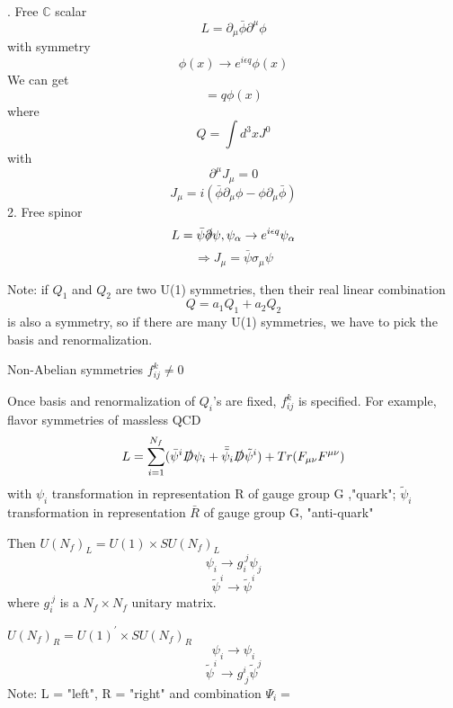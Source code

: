\documentclass[type = bachelor]{fduthesis-en}
\begin{document}
. Free $\mathbb{C}$ scalar 
\begin{equation}
L=\partial_{\mu}\bar{\phi}\partial^\mu\phi
\end{equation}
with symmetry 
\begin{equation}
\phi(x)\rightarrow e^{i\epsilon q}\phi(x)
\end{equation}
We can get
\begin{equation}
[Q,\phi(x)]=q\phi(x)
\end{equation}
where
\begin{equation}
Q=\int d^3x J^0 
\end{equation}
with 
\begin{equation}
\partial^\mu J_\mu = 0
\end{equation}
\begin{equation}
J_\mu=i(\bar{\phi}\partial_\mu\phi-\phi\partial_\mu\bar{\phi})
\end{equation}
2. Free spinor
\begin{equation}
L=\bar{\psi}\slashed{\partial}\psi, \psi_\alpha \rightarrow e^{i\epsilon q}\psi_\alpha
\end{equation}
$$\Rightarrow J_\mu = \bar{\psi}\sigma_\mu\psi$$

Note: if $Q_1$ and $Q_2$ are two U(1) symmetries, then their real linear combination 
\begin{equation}
Q=a_1Q_1+a_2Q_2
\end{equation}
is also a symmetry, so if there are many U(1) symmetries, we have to pick the basis and renormalization.

\bigskip
Non-Abelian symmetries $f^k_{ij}\neq0$

Once basis and renormalization of $Q_i$'s are fixed, $f^k_{ij}$ is specified. For example, flavor symmetries of massless QCD
\begin{equation}
L=\sum_{i=1}^{N_f}(\bar{\psi}^i\slashed{D}\psi_i+\bar{\tilde{\psi}}_i\slashed{D}\tilde{\psi}^i)+Tr(F_{\mu\nu}F^{\mu\nu})
\end{equation}
with $\psi_i$ transformation in representation R of gauge group G ,"quark";
$\tilde{\psi}_i$ transformation in representation $\bar{R}$ of gauge group G, "anti-quark"

Then $U(N_f)_L=U(1)\times SU(N_f)_L$
$$\psi_i \rightarrow g_i^{\ j}\psi_j$$
$$\tilde{\psi}^i\rightarrow\tilde{\psi}^i$$
where $g_i^{\ j}$ is a $N_f\times N_f$ unitary matrix.

$U(N_f)_R=U(1)^\prime\times SU(N_f)_R$
$$\psi_i \rightarrow \psi_i$$
$$\tilde{\psi}^i\rightarrow g^i_{\ j}\tilde{\psi}^j$$
Note: L = "left", R = "right" and combination $\Psi_i=$
\end{document}
